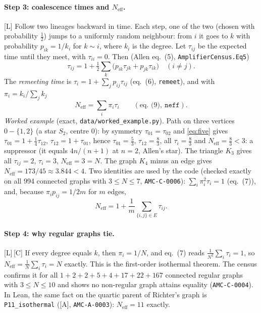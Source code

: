 \documentclass[10pt]{article}
\newcommand{\tier}[1]{\textsf{[#1]}}
\newcommand{\tA}{\tier{A}}
\newcommand{\tL}{\tier{L}}
\newcommand{\tC}{\tier{C}}
\newcommand{\lean}[1]{\texttt{#1}}
\newcommand{\Neff}{N_{\mathrm{eff}}}
\begin{document}
\paragraph{Step 3: coalescence times and $\Neff$.}\tL{} Follow two lineages backward in time. Each step, one of the two (chosen with
probability $\tfrac12$) jumps to a uniformly random neighbour: from $i$ it goes to $k$ with probability $p_{ik}=1/k_i$ for $k\sim i$,
where $k_i$ is the degree. Let $\tau_{ij}$ be the expected time until they meet, with $\tau_{ii}=0$. Then (Allen eq.~(5), \lean{AmplifierCensus.Eq5})
\begin{equation}\label{eq:five}
\tau_{ij}=1+\tfrac12\sum_k\bigl(p_{ik}\tau_{jk}+p_{jk}\tau_{ik}\bigr)\quad(i\ne j).
\end{equation}
The \emph{remeeting time} is $\tau_i=1+\sum_jp_{ij}\tau_{ij}$ (eq.~(6), \lean{remeet}), and with $\pi_i=k_i/\sum_jk_j$
\begin{equation}\label{eq:neff}
\Neff=\sum_i\pi_i\tau_i\qquad(\text{eq.~(9)},\ \lean{neff}).
\end{equation}
\emph{Worked example} (exact, \texttt{data/worked\_example.py}). Path on three vertices $0\!-\!\{1,2\}$ (a star $S_2$, centre $0$): by symmetry
$\tau_{01}=\tau_{02}$ and \eqref{eq:five} gives $\tau_{01}=1+\tfrac14\tau_{12}$, $\tau_{12}=1+\tau_{01}$, hence $\tau_{01}=\tfrac53$,
$\tau_{12}=\tfrac83$, all $\tau_i=\tfrac83$ and $\Neff=\tfrac83<3$: a suppressor (it equals $4n/(n+1)$ at $n=2$, Allen's star). The triangle $K_3$
gives all $\tau_{ij}=2$, $\tau_i=3$, $\Neff=3=N$. The graph $K_4$ minus an edge gives $\Neff=173/45\approx3.844<4$.
Two identities are used by the code (checked exactly on all 994 connected graphs with $3\le N\le7$, \texttt{AMC-C-0006}): $\sum_i\pi_i^2\tau_i=1$ (eq.~(7)), and, because $\pi_ip_{ij}=1/2m$ for $m$ edges,
\begin{equation}\label{eq:edge}
\Neff=1+\frac1m\sum_{\{i,j\}\in E}\tau_{ij}.
\end{equation}

\paragraph{Step 4: why regular graphs tie.}\tL{}\,\tC{} If every degree equals $k$, then $\pi_i=1/N$, and eq.~(7) reads $\tfrac1{N^2}\sum_i\tau_i=1$, so
$\Neff=\tfrac1N\sum_i\tau_i=N$ exactly. This is the first-order isothermal theorem. The census confirms it for all
$1+2+2+5+4+17+22+167$ connected regular graphs with $3\le N\le10$ and shows no non-regular graph attains equality (\texttt{AMC-C-0004}).
In Lean, the same fact on the quartic parent of Richter's graph is \lean{P11\_isothermal} (\tA, \texttt{AMC-A-0003}): $\Neff=11$ exactly.
\end{document}
